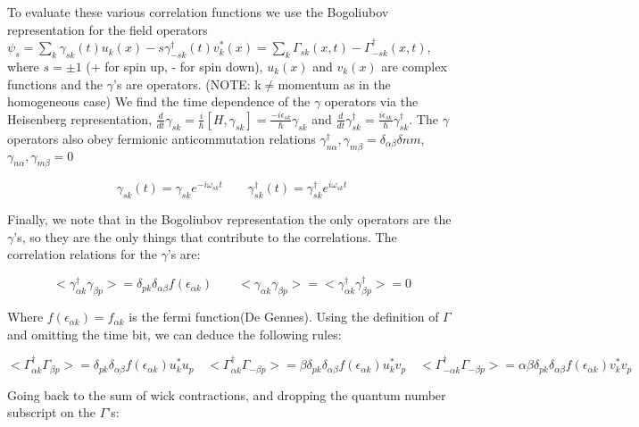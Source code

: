 \documentclass{article}
\begin{document}
To evaluate these various correlation functions we use the Bogoliubov representation for the field operators $\psi_s=\sum\limits_k \gamma_{sk}(t)u_k(x)-s\gamma_{-sk}^\dagger(t)v^*_{k}(x)=\sum\limits_k \Gamma_{sk}(x,t)-\Gamma_{-sk}^\dagger(x,t)$, where $s=\pm1$ (+ for spin up, - for spin down), $u_k(x)$ and $v_k(x)$ are complex functions and the $\gamma$'s are operators. (NOTE: k$\neq$momentum as in the homogeneous case) We find the time dependence of the $\gamma$ operators via the Heisenberg representation, $\frac{d}{dt}\gamma_{sk}=\frac{i}{\hbar}[H,\gamma_{sk}]=\frac{-i\epsilon_{sk}}{\hbar}\gamma_{sk}$ and $\frac{d}{dt}\gamma^\dagger_{sk}=\frac{i\epsilon_{sk}}{\hbar}\gamma^\dagger_{sk}$. The $\gamma$ operators also obey fermionic anticommutation relations ${\gamma^\dagger_{n\alpha}, \gamma_{m\beta}}=\delta_{\alpha\beta}\delta{nm}$, ${\gamma_{n\alpha},\gamma_{m\beta}}=0$

\begin{equation*}
\gamma_{sk}(t)=\gamma_{sk}e^{-i\omega_{sk}t}\quad\quad \gamma^\dagger_{sk}(t)=\gamma^\dagger_{sk}e^{i\omega_{sk}t}
\end{equation*}

Finally, we note that in the Bogoliubov representation the only operators are the $\gamma$'s, so they are the only things that contribute to the correlations. The correlation relations for the $\gamma$'s are:

\begin{equation*}
<\gamma^\dagger_{\alpha k}\gamma_{\beta p}>=\delta_{pk}\delta_{\alpha \beta}f(\epsilon_{\alpha k}) \quad\quad <\gamma_{\alpha k}\gamma_{\beta p}>=<\gamma^\dagger_{\alpha k}\gamma^\dagger_{\beta p}>=0
\end{equation*}

Where $f(\epsilon_{\alpha k})=f_{\alpha k}$ is the fermi function(De Gennes). Using the definition of $\Gamma$ and omitting the time bit, we can deduce the following rules:

\begin{equation*}
<\Gamma^\dagger_{\alpha k}\Gamma_{\beta p}>=\delta_{pk}\delta_{\alpha \beta}f(\epsilon_{\alpha k})u^*_k u_p \quad <\Gamma^\dagger_{\alpha k}\Gamma_{-\beta p}>=\beta\delta_{pk}\delta_{\alpha \beta}f(\epsilon_{\alpha k})u^*_k v_p \quad <\Gamma^\dagger_{-\alpha k}\Gamma_{-\beta p}>=\alpha\beta\delta_{pk}\delta_{\alpha \beta}f(\epsilon_{\alpha k})v^*_k v_p
\end{equation*}

Going back to the sum of wick contractions, and dropping the quantum number subscript on the $\Gamma$'s:
\end{document}
